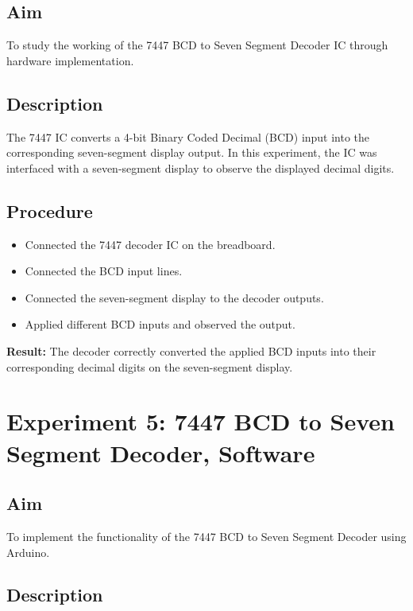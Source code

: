 \documentclass[12pt,a4paper]{report}
\begin{document}
\subsection*{Aim}

To study the working of the 7447 BCD to Seven Segment Decoder IC through hardware implementation.

\subsection*{Description}

The 7447 IC converts a 4-bit Binary Coded Decimal (BCD) input into the corresponding seven-segment display output. In this experiment, the IC was interfaced with a seven-segment display to observe the displayed decimal digits.

\subsection*{Procedure}

\begin{itemize}
    \item Connected the 7447 decoder IC on the breadboard.
    \item Connected the BCD input lines.
    \item Connected the seven-segment display to the decoder outputs.
    \item Applied different BCD inputs and observed the output.
\end{itemize}

\textbf{Result:} The decoder correctly converted the applied BCD inputs into their corresponding decimal digits on the seven-segment display.

\section{Experiment 5: 7447 BCD to Seven Segment Decoder, Software}

\subsection*{Aim}

To implement the functionality of the 7447 BCD to Seven Segment Decoder using Arduino.

\subsection*{Description}
\end{document}
